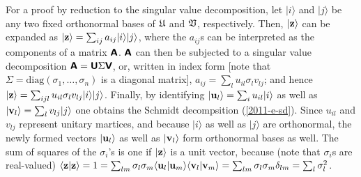 For a proof by reduction to the singular value decomposition,
let
$\vert i\rangle$
and
$\vert j\rangle$
be any two fixed orthonormal bases of $ {\frak U}$ and $ {\frak V}$, respectively.
Then,
$\vert {\bf z}\rangle $
can be expanded as
$\vert {\bf z}\rangle  = \sum_{ij}a_{ij} \vert i\rangle \vert j\rangle$,
where the $a_{ij}$s can be interpreted as the components of a matrix
$\textsf{\textbf{A}}$.
$\textsf{\textbf{A}}$ can then be subjected to a
singular value decomposition
$\textsf{\textbf{A}} = \textsf{\textbf{U}} \Sigma \textsf{\textbf{V}}$,
or, written in index form [note that $\Sigma=\textrm{diag}(\sigma_1, \ldots, \sigma_n)$ is a diagonal matrix],
$a_{ij}= \sum_l u_{il}\sigma_l v_{lj}$;
and hence  $\vert {\bf z}\rangle  = \sum_{ijl} u_{il}\sigma_l v_{lj}\vert i\rangle \vert j\rangle$.
Finally, by identifying
$\vert {\bf u}_l  \rangle = \sum_i u_{il} \vert i\rangle$
as well as
$\vert {\bf v}_l  \rangle = \sum_l v_{lj} \vert j\rangle$
one obtains the Schmidt decompsition (\ref{2011-e-sd}).
Since $u_{il}$ and $v_{ lj}$ represent unitary martices,
and because
 $\vert i\rangle$ as well as
 $\vert j\rangle$
are orthonormal,
the newly formed vectors
$\vert {\bf u}_l \rangle$
as well as
$\vert {\bf v}_l  \rangle$
form orthonormal bases as well.
The sum of squares of the $\sigma_i$'s is one if  $\vert {\bf z}\rangle $ is a unit vector,
because  (note that $\sigma_i$s are real-valued)
 $\langle {\bf z}\vert {\bf z}\rangle =1
=   \sum_{lm} \sigma_l \sigma_m   \langle {\bf u}_l  \vert  {\bf u}_m  \rangle   \langle  {\bf v}_l  \vert  {\bf v}_m  \rangle
=   \sum_{lm} \sigma_l \sigma_m  \delta_{lm}
=   \sum_{l} \sigma_l^2
$.


